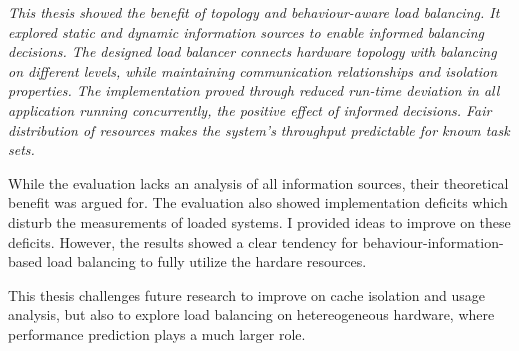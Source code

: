 {\itshape
This thesis showed the benefit of topology and behaviour-aware load balancing.
It explored static and dynamic information sources to enable informed balancing
decisions.
The designed load balancer connects hardware topology with balancing on
different levels, while maintaining communication relationships and isolation
properties.
The implementation proved through reduced run-time deviation in all application
running concurrently, the positive effect of informed decisions.
Fair distribution of resources makes the system's throughput predictable for
known task sets.

While the evaluation lacks an analysis of all information sources, their
theoretical benefit was argued for.
The evaluation also showed implementation deficits which disturb the
measurements of loaded systems.
I provided ideas to improve on these deficits.
However, the results showed a clear tendency for behaviour-information-based
load balancing to fully utilize the hardare resources.

This thesis challenges future research to improve on cache isolation and usage
analysis, but also to explore load balancing on hetereogeneous hardware, where
performance prediction plays a much larger role.
\/}


\cleardoublepage

